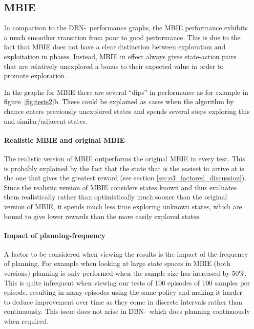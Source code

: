 \subsection{MBIE}
In comparison to the DBN-\etre\ performance graphs, the MBIE performance exhibits a much smoother transition from poor to good performance. This is due to the fact that MBIE does not have a clear distinction between exploration and exploitation in phases. Instead, MBIE in effect always gives state-action pairs that are relatively unexplored a bonus to their expected value in order to promote exploration.  

In the graphs for MBIE there are several ``dips'' in performance as for example in figure~\ref{fig:tests2}b. These could be explained as cases when the algorithm by chance enters previously unexplored states and spends several steps exploring this and similar/adjacent states. 

\paragraph{Realistic MBIE and original MBIE}
The realistic version of MBIE outperforms the original MBIE in every test. This is probably explained by the fact that the state that is the easiest to arrive at is the one that gives the greatest reward (see section \ref{sec:e3_factored_discussion}). Since the realistic version of MBIE considers states known and thus evaluates them  realistically rather than optimistically much sooner than the original version of MBIE, it spends much less time exploring unknown states, which are bound to give lower rewards than the more easily explored states. 

\paragraph{Impact of planning-frequency}
A factor to be considered when viewing the results is the impact of the frequency of planning. For example when looking at large state spaces in MBIE (both versions) planning is only performed when the sample size has increased by 50\%. This is quite infrequent when viewing our tests of 100 episodes of 100 samples per episode, resulting in many episodes using the same policy and making it harder to deduce improvement over time as they come in discrete intervals rather than continuously. This issue does not arise in DBN-\etre\ which does planning continuously when required.    


